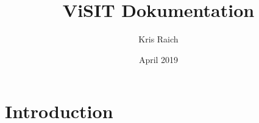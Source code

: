 \documentclass{article}
\title{ViSIT Dokumentation}
\author{Kris Raich}
\date{April 2019}
\begin{document}
\maketitle

\section{Introduction}
\end{document}
